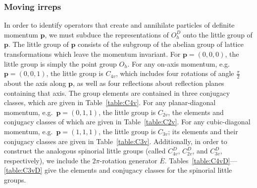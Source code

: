     \subsubsection{Moving irreps}
    In order to identify operators that create and annihilate particles of definite momentum $\boldsymbol p$, we must subduce the representations of $O_h^D$ onto the little group of $\boldsymbol p$. The little group of $\boldsymbol p$ consists of the subgroup of the abelian group of lattice transformations which leave the momentum invariant. For $\boldsymbol p = (0, 0, 0)$, the little group is simply the point group $O_h$. For any on-axis momentum, e.g.\ $\boldsymbol p = (0, 0, 1)$, the little group is $C_{4v}$, which includes four rotations of angle $\frac{\pi}{2}$ about the axis along $\boldsymbol p$, as well as four reflections about reflection planes containing that axis. The group elements are contained in three conjugacy classes, which are given in Table~\ref{table:C4v}.  For any planar-diagonal momentum, e.g.\ $\boldsymbol p = (0, 1, 1)$, the little group is $C_{2v}$, the elements and conjugacy classes of which are given in Table~\ref{table:C2v}. For any cubic-diagonal momentum, e.g.\ $\boldsymbol p = (1,1,1)$, the little group is $C_{3v}$; its elements and their conjugacy classes are given in Table~\ref{table:C3v}. Additionally, in order to construct the analogous spinorial little groups (called $C_{4v}^D$, $C_{2v}^D$, and $C_{3v}^D$, respectively), we include the $2\pi$-rotation generator $\overline E$. Tables~\ref{table:C4vD}---\ref{table:C3vD} give the elements and conjugacy classes for the spinorial little groups.
    
